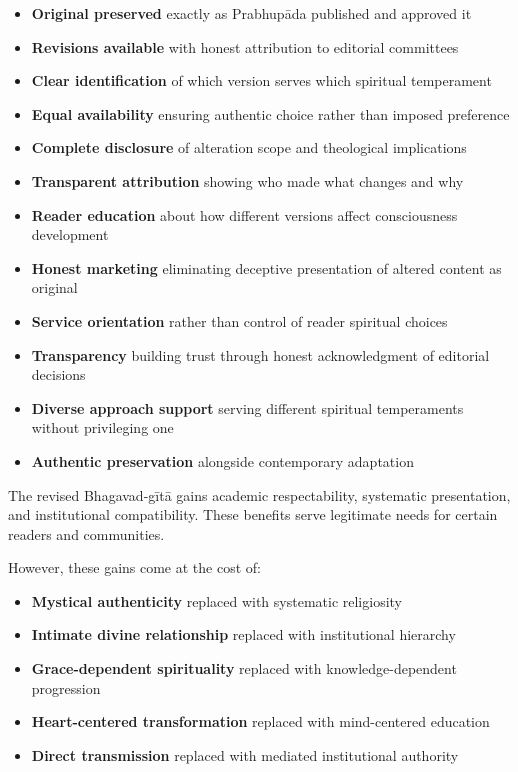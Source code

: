 \documentclass[12pt,twoside]{book}
\begin{document}
\begin{itemize}
\item \textbf{\textbf{Original preserved}} exactly as Prabhupāda published and approved it
\item \textbf{\textbf{Revisions available}} with honest attribution to editorial committees
\item \textbf{\textbf{Clear identification}} of which version serves which spiritual temperament
\item \textbf{\textbf{Equal availability}} ensuring authentic choice rather than imposed preference

\item \textbf{\textbf{Complete disclosure}} of alteration scope and theological implications
\item \textbf{\textbf{Transparent attribution}} showing who made what changes and why
\item \textbf{\textbf{Reader education}} about how different versions affect consciousness development
\item \textbf{\textbf{Honest marketing}} eliminating deceptive presentation of altered content as original

\item \textbf{\textbf{Service orientation}} rather than control of reader spiritual choices
\item \textbf{\textbf{Transparency}} building trust through honest acknowledgment of editorial decisions
\item \textbf{\textbf{Diverse approach support}} serving different spiritual temperaments without privileging one
\item \textbf{\textbf{Authentic preservation}} alongside contemporary adaptation
\end{itemize}

The revised Bhagavad-gītā gains academic respectability, systematic presentation, and institutional compatibility. These benefits serve legitimate needs for certain readers and communities.

However, these gains come at the cost of:
\begin{itemize}
\item \textbf{\textbf{Mystical authenticity}} replaced with systematic religiosity
\item \textbf{\textbf{Intimate divine relationship}} replaced with institutional hierarchy
\item \textbf{\textbf{Grace-dependent spirituality}} replaced with knowledge-dependent progression
\item \textbf{\textbf{Heart-centered transformation}} replaced with mind-centered education
\item \textbf{\textbf{Direct transmission}} replaced with mediated institutional authority
\end{itemize}
\end{document}
